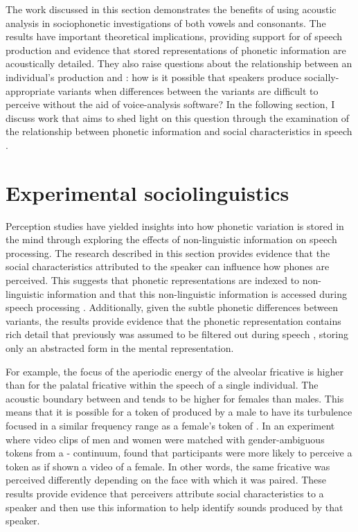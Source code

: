 The work discussed in this section demonstrates the benefits of using acoustic analysis in sociophonetic investigations of both vowels and consonants. The results have important theoretical implications, providing support for  of speech production and evidence that stored representations of phonetic information are acoustically detailed. They also raise questions about the relationship between an individual's production and : how is it possible that speakers produce socially-appropriate variants when differences between the variants are difficult to perceive without the aid of voice-analysis software? In the following section, I discuss work that aims to shed light on this question through the examination of the relationship between phonetic information and social characteristics in speech .


\section{Experimental sociolinguistics}\label{sec:perception}
Perception studies have yielded insights into how phonetic variation is stored in the mind through exploring the effects of non-lin\-guis\-tic information on speech processing. The research described in this section provides evidence that the social characteristics attributed to the speaker can influence how phones are perceived. This suggests that phonetic representations are indexed to non-lin\-guis\-tic information and that this non-lin\-guis\-tic information is accessed during speech pro\-cessing \citep{strand1999,campbellkibler2007,dragerunderrev}. Additionally, given the subtle phonetic differences between variants, the results provide evidence that the phonetic representation contains rich detail that previously was assumed to be filtered out during speech , storing only an abstracted form in the mental representation.

For example, the focus of the aperiodic energy of the alveolar fricative  is higher than for the palatal fricative  within the speech of a single individual. The acoustic boundary between  and  tends to be higher for females than males. This means that it is possible for a token of  produced by a male to have its turbulence focused in a similar frequency range as a female's token of . In an experiment where video clips of men and women were matched with gender-ambiguous tokens from a  -  continuum, \citet{strand1999,strand2000} found that participants were more likely to perceive a token as  if shown a video of a female. In other words, the same fricative was perceived differently depending on the face with which it was paired. These results provide evidence that perceivers attribute social characteristics to a speaker and then use this information to help identify sounds produced by that speaker.

